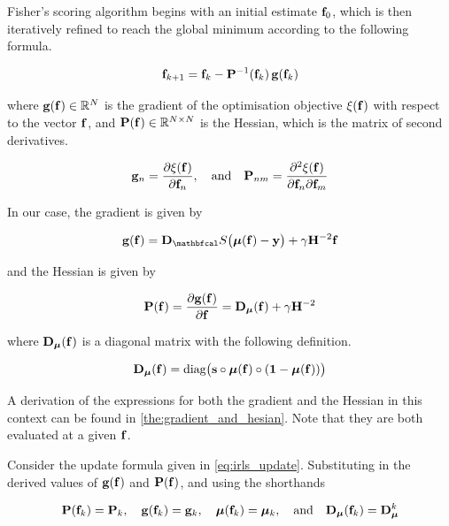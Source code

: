 Fisher's scoring algorithm begins with an initial estimate $\mathbf{f}_0$, which is then iteratively refined to reach the global minimum according to the following formula. 

\begin{equation}
    \label{eq:irls_update}
    \mathbf{f}_{k+1} = \mathbf{f}_{k} - \mathbf{P}^{-1}(\mathbf{f}_k) \, \mathbf{g}(\mathbf{f}_k)
\end{equation}

where $ \mathbf{g}(\mathbf{f}) \in \mathbb{R}^N$ is the gradient of the optimisation objective $\xi(\mathbf{f})$ with respect to the vector $\mathbf{f}$, and $\mathbf{P}(\mathbf{f}) \in \mathbb{R}^{N \times N}$ is the Hessian, which is the matrix of second derivatives. 

\begin{equation*}
    \mathbf{g}_n = \frac{\partial \xi(\mathbf{f})}{\partial \mathbf{f}_n}, \quad \text{and} \quad \mathbf{P}_{nm} = \frac{\partial^2 \xi(\mathbf{f})}{\partial \mathbf{f}_n \partial \mathbf{f}_m}
\end{equation*}

In our case, the gradient is given by 

\begin{equation}
    \g(\f) = \D_\St \big(\muu(\f) - \y\big) + \gamma \HH^{-2} \f
\end{equation}

and the Hessian is given by 

\begin{equation}
    \label{eq:logistic_gsr_P}
    \mathbf{P}(\mathbf{f}) = \frac{\partial \mathbf{g}(\mathbf{f})}{\partial \mathbf{f}} =  \mathbf{D}_{\boldsymbol{\mu}}(\mathbf{f}) + \gamma \mathbf{H}^{-2}
\end{equation}

where $\mathbf{D}_{\boldsymbol{\mu}}(\mathbf{f})$ is a diagonal matrix with the following definition. 

\begin{equation}
    \mathbf{D}_{\boldsymbol{\mu}}(\mathbf{f}) = \text{diag}\big(\mathbf{s} \circ \boldsymbol{\mu}(\mathbf{f}) \circ (\mathbf{1} - \boldsymbol{\mu}(\mathbf{f}))\big)
\end{equation}

A derivation of the expressions for both the gradient and the Hessian in this context can be found in \cref{the:gradient_and_hesian}. Note that they are both evaluated at a given $\mathbf{f}$. 

Consider the update formula given in \cref{eq:irls_update}. Substituting in the derived values of $\mathbf{g}(\mathbf{f})$ and $\mathbf{P}(\mathbf{f})$, and using the shorthands

\begin{equation*}
    \mathbf{P}(\mathbf{f}_k) = \mathbf{P}_k, \quad \mathbf{g}(\mathbf{f}_k) = \mathbf{g}_k, \quad \boldsymbol{\mu}(\mathbf{f}_k) = \boldsymbol{\mu}_k, \quad \text{and} \quad \mathbf{D}_{\boldsymbol{\mu}}(\mathbf{f}_k) = \mathbf{D}_{\boldsymbol{\mu}}^k
\end{equation*}

